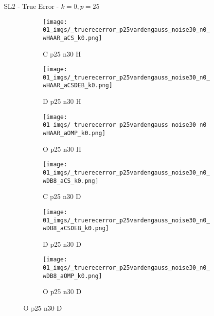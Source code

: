 \begin{frame}{SL2 - True Error - $k=0,p=25$}{}
\begin{figure}
\vspace{5pt}

\begin{subfigure}{0.13\textwidth}
\texttt{[image: 01\_imgs/\_truerecerror\_p25vardengauss\_noise30\_n0\_wHAAR\_aCS\_k0.png]}
\caption*{\tiny C p25 n30 H}
\end{subfigure}
\begin{subfigure}{0.13\textwidth}
\texttt{[image: 01\_imgs/\_truerecerror\_p25vardengauss\_noise30\_n0\_wHAAR\_aCSDEB\_k0.png]}
\caption*{\tiny D p25 n30 H}
\end{subfigure}
\begin{subfigure}{0.13\textwidth}
\texttt{[image: 01\_imgs/\_truerecerror\_p25vardengauss\_noise30\_n0\_wHAAR\_aOMP\_k0.png]}
\caption*{\tiny O p25 n30 H}
\end{subfigure}
\begin{subfigure}{0.13\textwidth}
\texttt{[image: 01\_imgs/\_truerecerror\_p25vardengauss\_noise30\_n0\_wDB8\_aCS\_k0.png]}
\caption*{\tiny C p25 n30 D}
\end{subfigure}
\begin{subfigure}{0.13\textwidth}
\texttt{[image: 01\_imgs/\_truerecerror\_p25vardengauss\_noise30\_n0\_wDB8\_aCSDEB\_k0.png]}
\caption*{\tiny D p25 n30 D}
\end{subfigure}
\begin{subfigure}{0.13\textwidth}
\texttt{[image: 01\_imgs/\_truerecerror\_p25vardengauss\_noise30\_n0\_wDB8\_aOMP\_k0.png]}
\caption*{\tiny O p25 n30 D}
\end{subfigure}
\end{figure}
\end{frame}

